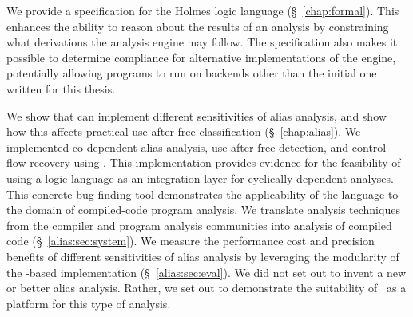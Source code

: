 We provide a specification for the Holmes logic language (\S~\ref{chap:formal}).
This enhances the ability to reason about the results of an analysis by constraining what derivations the analysis engine may follow.
The specification also makes it possible to determine compliance for alternative implementations of the engine, potentially allowing programs to run on backends other than the initial one written for this thesis.

We show that \sysname can implement different sensitivities of alias analysis, and show how this affects practical use-after-free classification (\S~\ref{chap:alias}).
We implemented co-dependent alias analysis, use-after-free detection, and control flow recovery using \sysname.
This implementation provides evidence for the feasibility of using a logic language as an integration layer for cyclically dependent analyses.
This concrete bug finding tool demonstrates the applicability of the \sysname language to the domain of compiled-code program analysis.
We translate analysis techniques from the compiler and program analysis communities into analysis of compiled code (\S~\ref{alias:sec:system}).
We measure the performance cost and precision benefits of different sensitivities of alias analysis by leveraging the modularity of the \sysname-based implementation (\S~\ref{alias:sec:eval}).
We did not set out to invent a new or better alias analysis.
Rather, we set out to demonstrate the suitability of \sysname\ as a platform for this type of analysis.
